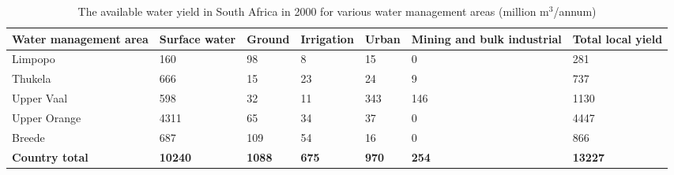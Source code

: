 \begin{table}[h]
\begin{center}
\caption{The available water yield in South Africa in 2000 for various water management areas (million m$^{3}$/annum)}
\label{tab:water yield}
\begin{tabular}{|p{3cm}|p{1.5cm}|p{1cm}|p{1cm}|p{1.5cm}|p{1cm}|p{1.5cm}|}\hline
Water management area & Surface water & Ground & Irrigation & Urban & Mining and bulk industrial & Total local yield \\\hline
Limpopo & 160 & 98 & 8 & 15 & 0 & 281 \\\hline
Thukela & 666 & 15 & 23 & 24 & 9 & 737 \\\hline
Upper Vaal & 598 & 32 & 11 & 343 & 146 & 1130 \\\hline
Upper Orange & 4311 & 65 & 34 & 37 & 0 & 4447 \\\hline
Breede & 687 & 109 & 54 & 16 & 0 & 866 \\\hline\hline
\textbf{Country total} & \textbf{10240} & \textbf{1088} & \textbf{675} & \textbf{970} & \textbf{254} & \textbf{13227} \\\hline
\end{tabular}
\end{center}
\end{table}

